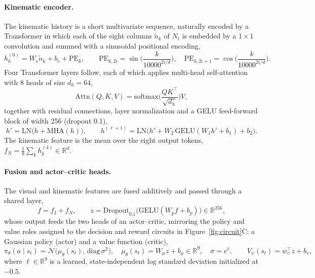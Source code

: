 \documentclass[utf8]{frontiers_suppmat}
\begin{document}
\paragraph*{Kinematic encoder.} The kinematic history is a short multivariate sequence, naturally encoded by a Transformer in which each of the eight columns $\tilde n_k$ of $N_t$ is embedded by a $1\times1$ convolution and summed with a sinusoidal positional encoding,
\begin{equation}\label{eq:pe_sin}
h^{(0)}_k=W_e\tilde n_k+b_e+\mathrm{PE}_k,\qquad \mathrm{PE}_{k,2i}=\sin\!\Big(\frac{k}{10000^{2i/d}}\Big),\quad \mathrm{PE}_{k,2i+1}=\cos\!\Big(\frac{k}{10000^{2i/d}}\Big).
\end{equation}
Four Transformer layers follow, each of which applies multi-head self-attention with 8 heads of size $d_h=64$,
\begin{equation}\label{eq:attn}
\mathrm{Attn}(Q,K,V)=\mathrm{softmax}\!\Big(\frac{QK^{\top}}{\sqrt{d_h}}\Big)V,
\end{equation}
together with residual connections, layer normalization and a GELU feed-forward block of width 256 (dropout 0.1),
\begin{equation}\label{eq:tlayer}
h'=\mathrm{LN}\big(h+\mathrm{MHA}(h)\big),\qquad h^{(\ell+1)}=\mathrm{LN}\big(h'+W_2\,\mathrm{GELU}(W_1h'+b_1)+b_2\big).
\end{equation}
The kinematic feature is the mean over the eight output tokens, $f_N=\tfrac18\sum_{k}h^{(4)}_k\in\mathbb R^{d}$.

\paragraph*{Fusion and actor--critic heads.} The visual and kinematic features are fused additively and passed through a shared layer,
\begin{equation}\label{eq:fusion}
f=f_I+f_N,\qquad z=\mathrm{Dropout}_{0.1}\big(\mathrm{GELU}(W_pf+b_p)\big)\in\mathbb R^{256},
\end{equation}
whose output feeds the two heads of an actor--critic, mirroring the policy and value roles assigned to the decision and reward circuits in Figure~\ref{fig:circuit}C: a Gaussian policy (actor) and a value function (critic),
\begin{equation}\label{eq:heads}
\pi_\theta(a\mid s_t)=\mathcal N\!\big(\mu_\theta(s_t),\,\mathrm{diag}\,\sigma^{2}\big),\quad \mu_\theta(s_t)=W_\mu z+b_\mu\in\mathbb R^{9},\quad \sigma=e^{\boldsymbol\ell},\qquad V_\psi(s_t)=w_v^{\top}z+b_v ,
\end{equation}
where $\boldsymbol\ell\in\mathbb R^9$ is a learned, state-independent log standard deviation initialized at $-0.5$.
\end{document}
